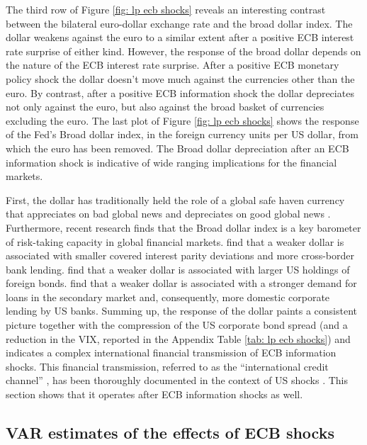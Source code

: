 \documentclass[a4paper,12pt]{article}
\begin{document}
The third row of Figure \ref{fig: lp ecb shocks} reveals an interesting contrast between
the bilateral euro-dollar exchange rate and the broad dollar index. 
The dollar weakens against the euro to a similar extent after
a positive ECB interest rate surprise of either kind.
However, the response of the broad dollar depends on the nature of the ECB interest rate surprise. After a positive ECB monetary policy shock the dollar doesn't move much against the currencies other than the euro.
By contrast, after a positive ECB information shock the dollar depreciates not only against
the euro, but also against
the broad basket of currencies excluding the euro.
The last plot of Figure \ref{fig: lp ecb shocks} shows the response of the Fed's Broad dollar index,
in the foreign currency units per US dollar, from which the euro has been removed.
The Broad dollar depreciation after an ECB information shock is indicative of wide ranging implications for the financial markets.

First, the dollar has traditionally held the role
of a global safe haven currency that appreciates on bad global news and depreciates on good global news \citep[e.g.][]{Gourinchas_etal_2010,Habib_Stracca_2015}. 
Furthermore, recent research finds that the Broad dollar index is a key barometer of risk-taking capacity in global financial markets.
\cite{Avdjiev_Du_Koch_Shin_2019} find that a weaker dollar is associated with smaller covered interest parity deviations and more cross-border bank lending.
\cite{Lilley_Maggiori_Neiman_Schreger_2019} find that a weaker dollar is associated with larger US holdings of foreign bonds.
\cite{Niepmann_Schmidt_2019} find that a weaker dollar is associated with a stronger demand for loans in the secondary market and, consequently, more domestic corporate lending by US banks.
Summing up, the response of the dollar paints a consistent picture together with the compression of the US corporate bond spread (and a reduction in the VIX, reported in the Appendix Table \ref{tab: lp ecb shocks}) and indicates a complex international financial transmission of ECB information shocks.
This financial transmission, referred to as the ``international credit channel'' \citep{Rey_2016},
has been thoroughly documented in the context of US shocks \citep{CesaBianchi_Sokol_2022}.
This section shows that it operates after ECB information shocks as well.

\subsection{VAR estimates of the effects of ECB shocks}
\end{document}

